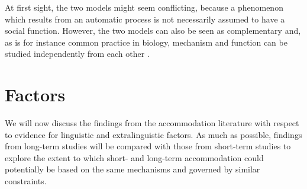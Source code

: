 \documentclass[output=paper,
modfonts
]{langscibook}
\begin{document}
At first sight, the two models might seem conflicting, because a phenomenon which results from an automatic process is not necessarily assumed to have a social function. However, the two models can also be seen as complementary and, as is for instance common practice in biology, mechanism and function can be studied independently from each other \citep{ruch_function_2018}.


% 
% 
% 
% 




\section{Factors} \label{Section_Factors}

We will now discuss the findings from the accommodation literature with respect to evidence for linguistic and extralinguistic factors. As much as possible, findings from long-term studies will be compared with those from short-term studies to explore the extent to which short- and long-term accommodation could potentially be based on the same mechanisms and governed by similar constraints.
% 
% 
% 
% 
%
% 
%
\end{document}
